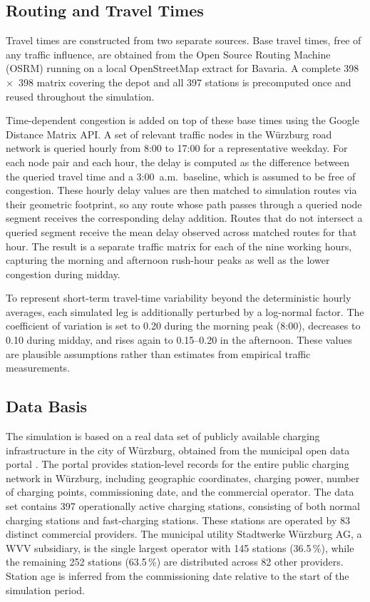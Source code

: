 \documentclass[12pt,oneside]{article}
\begin{document}
\subsection{Routing and Travel Times}\label{subsec:routing_travel}
Travel times are constructed from two separate sources. Base travel times, free of any traffic influence, are obtained from the Open Source Routing Machine (OSRM) running on a local OpenStreetMap extract for Bavaria. A complete 398~$\times$~398 matrix covering the depot and all 397 stations is precomputed once and reused throughout the simulation.

Time-dependent congestion is added on top of these base times using the Google Distance Matrix API. A set of relevant traffic nodes in the Würzburg road network is queried hourly from 8:00 to 17:00 for a representative weekday. For each node pair and each hour, the delay is computed as the difference between the queried travel time and a 3:00~a.m.\ baseline, which is assumed to be free of congestion. These hourly delay values are then matched to simulation routes via their geometric footprint, so any route whose path passes through a queried node segment receives the corresponding delay addition. Routes that do not intersect a queried segment receive the mean delay observed across matched routes for that hour. The result is a separate traffic matrix for each of the nine working hours, capturing the morning and afternoon rush-hour peaks as well as the lower congestion during midday.

To represent short-term travel-time variability beyond the deterministic hourly averages, each simulated leg is additionally perturbed by a log-normal factor. The coefficient of variation is set to 0.20 during the morning peak (8:00), decreases to 0.10 during midday, and rises again to 0.15--0.20 in the afternoon. These values are plausible assumptions rather than estimates from empirical traffic measurements.


\subsection{Data Basis}\label{subsec_data_basis}
The simulation is based on a real data set of publicly available charging infrastructure in the city of Würzburg, obtained from the municipal open data portal \citep{wuerzburg_opendata}. The portal provides station-level records for the entire public charging network in Würzburg, including geographic coordinates, charging power, number of charging points, commissioning date, and the commercial operator. The data set contains 397 operationally active charging stations, consisting of both normal charging stations and fast-charging stations. These stations are operated by 83 distinct commercial providers. The municipal utility Stadtwerke Würzburg AG, a WVV subsidiary, is the single largest operator with 145 stations (36.5\,\%), while the remaining 252 stations (63.5\,\%) are distributed across 82 other providers. Station age is inferred from the commissioning date relative to the start of the simulation period.
\end{document}
